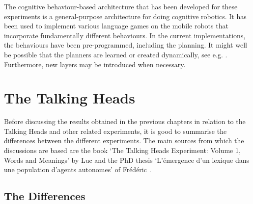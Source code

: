 The cognitive behaviour-based architecture that has been developed for these experiments is a general-purpose architecture for doing cognitive robotics. It has been used to implement various language games on the mobile robots that incorporate fundamentally different behaviours. In the current implementations, the behaviours have been pre-programmed, including the planning. It might well be possible that the planners are learned or created dynamically, see e.g. \citep{barnesetal:1997}. Furthermore, new layers may be introduced when necessary.


\section{The Talking Heads}\label{s:disc:th}

Before discussing the results obtained in the previous chapters in relation to the Talking Heads and other related experiments, it is good to summarise the differences between the different experiments. The main sources from which the discussions are based are the book `The Talking Heads Experiment: Volume 1, Words and Meanings' by Luc \citet{steels:2000} and the PhD thesis `{L'\'emergence d'un lexique dans une population d'agents autonomes}' of Fr\'ed\'eric \citet{kaplan:2000}.

\subsection{The Differences}

